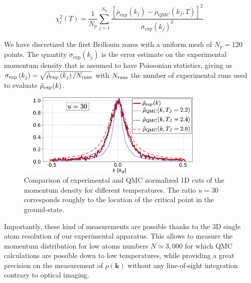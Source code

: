 \begin{equation}
    \chi_{\mathrm{r}}^{2}(T)=\frac{1}{N_{p}} \sum_{j=1}^{N_{p}} \frac{\left[\bar{\rho}_{\mathrm{exp}}\left(k_{j}\right)-\bar{\rho}_{\mathrm{QMC}}\left(k_{j}, T\right)\right]^{2}}{\sigma_{\exp }\left(k_{j}\right)^{2}}
\end{equation}

\noindent We have discretized the first Brillouin zones with a uniform mesh of $N_p=120$ points. The quantity $\sigma_{\exp }\left(k_{j}\right)$ is the error estimate on the experimental momentum density that is assumed to have Poissonian statistics, giving us $\sigma_{\exp }\left(k_{j}\right)=\sqrt{\tilde{\rho}_{\exp }\left(k_{j}\right) / N_{\rm{runs}}}$ with $N_{\rm{runs}}$ the number of experimental runs used to evaluate $\tilde{\rho}_{\rm{exp}}(k)$.


\begin{figure}
    \centering
    \includegraphics[width=0.8\textwidth]{Fig/Chapter3/comp_qmc.png}
    \caption[Comparison of experimental and QMC normalized 1D cuts of the momentum density for different temperatures]{Comparison of experimental and QMC normalized 1D cuts of the momentum density for different temperatures. The ratio $u=30$ corresponds roughly to the location of the critical point in the ground-state.}
    \label{fig:comp_qmc}
\end{figure}

Importantly, these kind of measurements are possible thanks to the 3D single atom resolution of our experimental apparatus. This allows to measure the momentum distribution for low atoms numbers $N \simeq 3,000$ for which QMC calculations are possible down to low temperatures, while providing a great precision on the measurement of $\rho(\bm{k})$ without any line-of-sight integration contrary to optical imaging.

